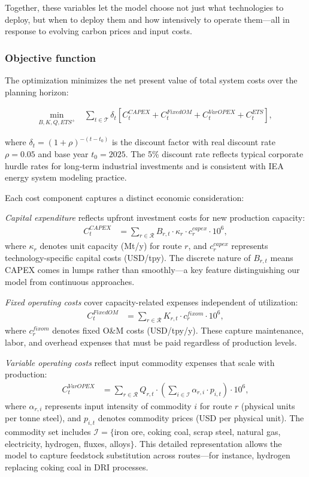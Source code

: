 Together, these variables let the model choose not just what technologies to deploy, but when to deploy them and how intensively to operate them—all in response to evolving carbon prices and input costs.

\subsubsection{Objective function}

The optimization minimizes the net present value of total system costs over the planning horizon:

\begin{align}
\min_{B,K,Q,ETS^+} \; & \sum_{t \in \mathcal{T}} \delta_t \left[ C^{CAPEX}_t + C^{FixedOM}_t + C^{VarOPEX}_t + C^{ETS}_t \right],
\end{align}

where $\delta_t = (1+\rho)^{-(t-t_0)}$ is the discount factor with real discount rate $\rho = 0.05$ and base year $t_0 = 2025$. The 5\% discount rate reflects typical corporate hurdle rates for long-term industrial investments and is consistent with IEA energy system modeling practice.

Each cost component captures a distinct economic consideration:

\textit{Capital expenditure} reflects upfront investment costs for new production capacity:
\begin{align}
C^{CAPEX}_t &= \sum_{r \in \mathcal{R}} B_{r,t} \cdot \kappa_r \cdot c^{capex}_r \cdot 10^6, \label{eq:capex}
\end{align}
where $\kappa_r$ denotes unit capacity (Mt/y) for route $r$, and $c^{capex}_r$ represents technology-specific capital costs (USD/tpy). The discrete nature of $B_{r,t}$ means CAPEX comes in lumps rather than smoothly—a key feature distinguishing our model from continuous approaches.

\textit{Fixed operating costs} cover capacity-related expenses independent of utilization:
\begin{align}
C^{FixedOM}_t &= \sum_{r \in \mathcal{R}} K_{r,t} \cdot c^{fixom}_r \cdot 10^6, \label{eq:fixom}
\end{align}
where $c^{fixom}_r$ denotes fixed O\&M costs (USD/tpy/y). These capture maintenance, labor, and overhead expenses that must be paid regardless of production levels.

\textit{Variable operating costs} reflect input commodity expenses that scale with production:
\begin{align}
C^{VarOPEX}_t &= \sum_{r \in \mathcal{R}} Q_{r,t} \cdot \left( \sum_{i \in \mathcal{I}} \alpha_{r,i} \cdot p_{i,t} \right) \cdot 10^6, \label{eq:varopex}
\end{align}
where $\alpha_{r,i}$ represents input intensity of commodity $i$ for route $r$ (physical units per tonne steel), and $p_{i,t}$ denotes commodity prices (USD per physical unit). The commodity set includes $\mathcal{I} = \{$iron ore, coking coal, scrap steel, natural gas, electricity, hydrogen, fluxes, alloys$\}$. This detailed representation allows the model to capture feedstock substitution across routes—for instance, hydrogen replacing coking coal in DRI processes.


